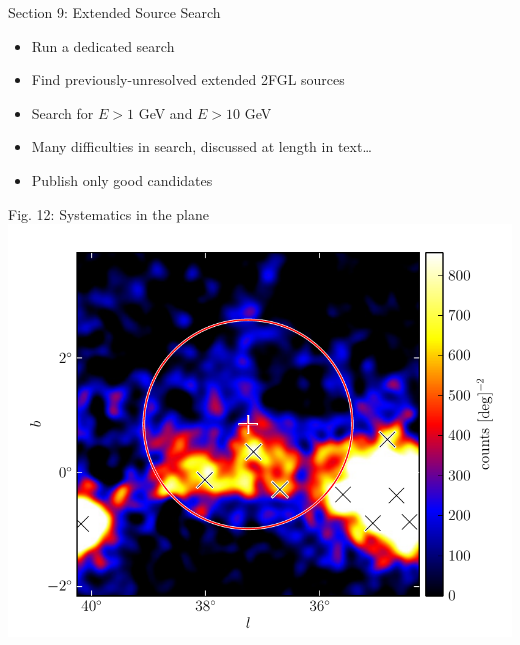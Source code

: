 \documentclass[12pt]{beamer}
\begin{document}
\begin{frame}{Section 9: Extended Source Search}
  \begin{itemize}
    \item Run a dedicated search 
    \item Find previously-unresolved
      extended 2FGL sources
    \item Search for $E>1$ GeV and $E>10$ GeV
    \item Many difficulties in search, discussed at length in text\dots
    \item Publish only good candidates
  \end{itemize}
\end{frame}

\begin{frame}{Fig. 12: Systematics in the plane}
  \includegraphics[scale=0.5]{plots/example_bad_fit_color.pdf}
\end{frame}
\end{document}
